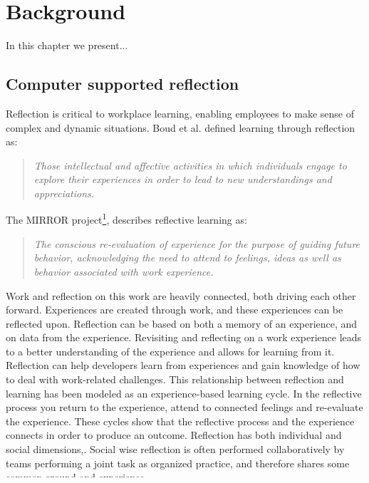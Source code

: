 \chapter{Background}
\label{chap:background}
In this chapter we present...

\section{Computer supported reflection}
Reflection is critical to workplace learning, enabling employees to make sense of complex and dynamic situations\citep{Schon1983}. Boud et al.\citep{boudreflection1985} defined learning through reflection as: 
\begin{quote}
\emph{Those intellectual and affective activities in which individuals engage to explore their experiences in order to lead to new understandings and appreciations.}
\end{quote}
The MIRROR project\footnote{\url{http://www.mirror-project.eu/}}, describes reflective learning as:
\begin{quote}
\emph{The conscious re-evaluation of experience for the purpose of guiding future behavior, acknowledging the need to attend to feelings, ideas as well as behavior associated with work experience.}\citep{krogstiemodel}
\end{quote}

Work and reflection on this work are heavily connected\citep{Schon1983}, both driving each other forward. Experiences are created through work, and these experiences can be reflected upon. Reflection can be based on both a memory of an experience, and on data from the experience. Revisiting and reflecting on a work experience leads to a better understanding of the experience and allows for learning from it. Reflection can help developers learn from experiences and gain knowledge of how to deal with work-related challenges. This relationship between reflection and learning has been modeled as an experience-based learning cycle\citep{boudreflection1985,Korthagen_Vasalos_2005, KolbModel}. In the reflective process you return to the experience, attend to connected feelings and re-evaluate
the experience. These cycles show that the reflective process and the experience connects in order to produce an outcome.
Reflection has both individual and social dimensions,\citep{Høyrup_2004,Woerkom_Croon_2008}. Social wise reflection is often performed collaboratively by teams performing a joint task as organized practice, and therefore shares some common ground and experience. \\*
Most reflective learning in a work environment, happens analogically without support of technology\citep{Schindler_Eppler_2003}. Technology has been shown to increase the potency of reflection and reflective learning at work, meaning computer-supported reflection tools can be used to promote reflection and experience based learning \citep{krogstiereflectionwork, Lin_Hmelo_Kinzer_Secules_1999,Xiao_Clark_Rosson_Carroll_2008}. 

